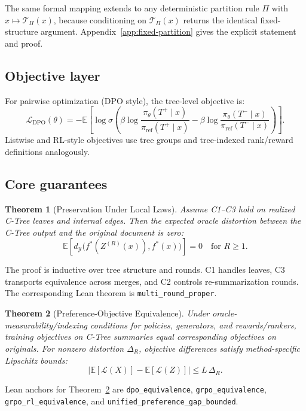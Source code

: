 \documentclass[11pt]{article}
\newtheorem{theorem}{Theorem}
\newcommand{\E}{\mathbb{E}}
\newcommand{\Y}{\mathcal{Y}}
\newcommand{\metric}{d_{\Y}}
\newcommand{\fstar}{f^\ast}
\begin{document}
The same formal mapping extends to any deterministic partition rule $\Pi$ with $x\mapsto\mathcal{T}_\Pi(x)$, because conditioning on $\mathcal{T}_\Pi(x)$ returns the identical fixed-structure argument. Appendix~\ref{app:fixed-partition} gives the explicit statement and proof.

\subsection{Objective layer}

For pairwise optimization (DPO style), the tree-level objective is:
\[
\mathcal{L}_{\mathrm{DPO}}(\theta)
= -\E\!\left[\log\sigma\!\left(
\beta\log\frac{\pi_\theta(T^+\mid x)}{\pi_{\mathrm{ref}}(T^+\mid x)}
-\beta\log\frac{\pi_\theta(T^-\mid x)}{\pi_{\mathrm{ref}}(T^-\mid x)}
\right)\right].
\]
Listwise and RL-style objectives use tree groups and tree-indexed rank/reward definitions analogously.

\subsection{Core guarantees}

\begin{theorem}[Preservation Under Local Laws]\label{thm:preservation}
Assume C1--C3 hold on realized C-Tree leaves and internal edges.
Then the expected oracle distortion between the C-Tree output and the original document is zero:
\[
\E\left[\metric\big(\fstar(Z^{(R)}(x)),\fstar(x)\big)\right]=0\quad\text{for }R\ge1.
\]
\end{theorem}

The proof is inductive over tree structure and rounds. C1 handles leaves, C3 transports equivalence across merges, and C2 controls re-summarization rounds. The corresponding Lean theorem is \texttt{multi\_round\_proper}.

\begin{theorem}[Preference-Objective Equivalence]\label{thm:equiv}
Under oracle-measurability/indexing conditions for policies, generators, and rewards/rankers,
training objectives on C-Tree summaries equal corresponding objectives on originals.
For nonzero distortion $\Delta_R$, objective differences satisfy method-specific Lipschitz bounds:
\[
\left|\E[\mathcal{L}(X)]-\E[\mathcal{L}(Z)]\right| \le L\,\Delta_R.
\]
\end{theorem}

Lean anchors for Theorem~\ref{thm:equiv} are \texttt{dpo\_equivalence}, \texttt{grpo\_equivalence}, \texttt{grpo\_rl\_equivalence}, and \texttt{unified\_preference\_gap\_bounded}.
\end{document}
